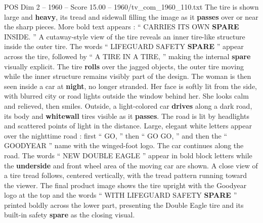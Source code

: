 \begin{textsample}{POS Dim 2 – 1960 – Score 15.00 – 1960/tv\_com\_1960\_110.txt}
The tire is shown large and \textbf{heavy}, its tread and sidewall filling the image as it \textbf{passes} over or near the sharp pieces.
More bold text appears : “ CARRIES ITS OWN \textbf{SPARE} INSIDE. ” A cutaway-style view of the tire reveals an inner tire-like structure inside the outer tire.
The words “ LIFEGUARD SAFETY \textbf{SPARE} ” appear across the tire, followed by “ A TIRE IN A TIRE, ” making the internal \textbf{spare} visually explicit.
The tire \textbf{rolls} over the jagged objects, the outer tire moving while the inner structure remains visibly part of the design.
The woman is then seen inside a car at \textbf{night}, no longer stranded.
Her face is softly lit from the side, with blurred city or road lights outside the window behind her.
She looks calm and relieved, then smiles.
Outside, a light-colored car \textbf{drives} along a dark road, its body and \textbf{whitewall} tires visible as it \textbf{passes}.
The road is lit by headlights and scattered points of light in the distance.
Large, elegant white letters appear over the nighttime road : first “ GO, ” then “ GO GO, ” and then the “ GOODYEAR ” name with the winged-foot logo.
The car continues along the road.
The words “ NEW DOUBLE EAGLE ” appear in bold block letters while the \textbf{underside} and front wheel area of the moving car are shown.
A close view of a tire tread follows, centered vertically, with the tread pattern running toward the viewer.
The final product image shows the tire upright with the Goodyear logo at the top and the words “ WITH LIFEGUARD SAFETY \textbf{SPARE} ” printed boldly across the lower part, presenting the Double Eagle tire and its built-in safety \textbf{spare} as the closing visual.

\end{textsample}

